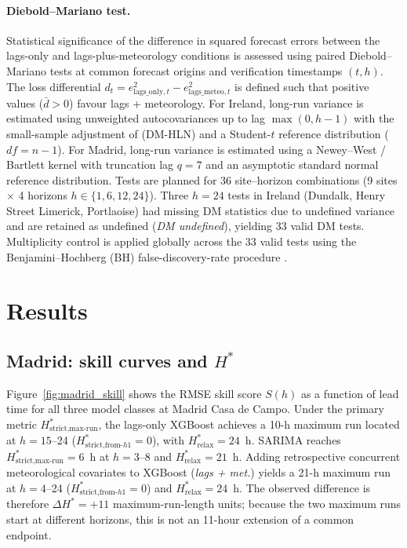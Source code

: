 \documentclass[12pt,a4paper]{article}
\begin{document}
\paragraph{Diebold--Mariano test.}
Statistical significance of the difference in squared forecast errors between
the lags-only and lags-plus-meteorology conditions is assessed using paired
Diebold--Mariano tests \citep{Diebold1995} at common forecast origins and verification
timestamps $(t, h)$.  The loss differential $d_t = e_{\text{lags\_only}, t}^2 - e_{\text{lags\_meteo}, t}^2$
is defined such that positive values ($\bar{d} > 0$) favour lags + meteorology.
For Ireland, long-run variance is estimated using unweighted autocovariances up to lag $\max(0, h-1)$ with the small-sample adjustment of \citet{Harvey1997} (DM-HLN) and a Student-$t$ reference distribution ($df = n-1$). For Madrid, long-run variance is estimated using a Newey--West / Bartlett kernel with truncation lag $q = 7$ and an asymptotic standard normal reference distribution.
Tests are planned for 36 site--horizon combinations (9 sites $\times$ 4 horizons $h \in \{1, 6, 12, 24\}$). Three $h = 24$ tests in Ireland (Dundalk, Henry Street Limerick, Portlaoise) had missing DM statistics due to undefined variance and are retained as undefined (\textit{DM undefined}), yielding 33 valid DM tests.
Multiplicity control is applied globally across the 33 valid tests using the Benjamini--Hochberg (BH) false-discovery-rate procedure \citep{Benjamini1995}.

\section{Results}
\label{sec:results}

\subsection{Madrid: skill curves and $H^*$}

Figure~\ref{fig:madrid_skill} shows the RMSE skill score $S(h)$ as a function
of lead time for all three model classes at Madrid Casa de Campo.  Under the
primary metric $H^*_{\text{strict,max-run}}$, the lags-only XGBoost achieves a
10-h maximum run located at $h=15$--24 ($H^*_{\text{strict,from-}h1}=0$), with
$H^*_{\text{relax}}=24$~h.  SARIMA reaches $H^*_{\text{strict,max-run}}=6$~h
at $h=3$--8 and $H^*_{\text{relax}}=21$~h.  Adding retrospective concurrent
meteorological covariates to XGBoost (\textit{lags + met.}) yields a 21-h
maximum run at $h=4$--24 ($H^*_{\text{strict,from-}h1}=0$) and
$H^*_{\text{relax}}=24$~h.  The observed difference is therefore
$\Delta H^*=+11$ maximum-run-length units; because the two maximum runs start at
different horizons, this is not an 11-hour extension of a common endpoint.
\end{document}
